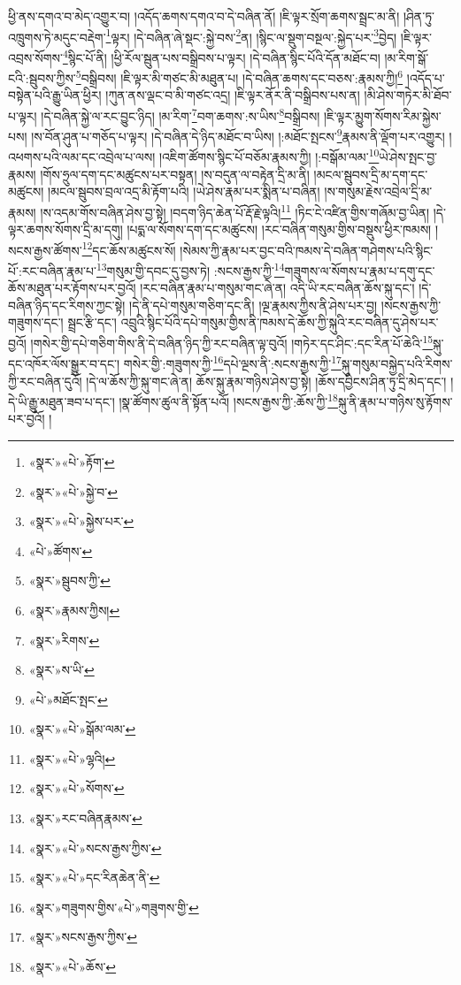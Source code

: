 ཕྱི་ནས་དགའ་བ་མེད་འགྱུར་བ། །འདོད་ཆགས་དགའ་བ་དེ་བཞིན་ནོ། །ཇི་ལྟར་སྲོག་ཆགས་སྦྲང་མ་ནི། །ཤིན་ཏུ་འཁྲུགས་ཏེ་མདུང་བརྡེག་\footnote{«སྣར་»«པེ་»རྟོག་}ལྟར། །དེ་བཞིན་ཞེ་སྡང་:སྐྱེ་བས་\footnote{«སྣར་»«པེ་»སྐྱེ་བ་}ན། །སྙིང་ལ་སྡུག་བསྔལ་:སྐྱེད་པར་\footnote{«སྣར་»«པེ་»སྐྱེས་པར་}བྱེད། །ཇི་ལྟར་འབྲས་སོགས་\footnote{«པེ་»ཚོགས་}སྙིང་པོ་ནི། །ཕྱི་རོལ་སྦུན་པས་བསྒྲིབས་པ་ལྟར། །དེ་བཞིན་སྙིང་པོའི་དོན་མཐོང་བ། །མ་རིག་སྒོ་ངའི་:སྦུབས་ཀྱིས་\footnote{«སྣར་»སྦུབས་ཀྱི་}བསྒྲིབས། །ཇི་ལྟར་མི་གཙང་མི་མཐུན་པ། །དེ་བཞིན་ཆགས་དང་བཅས་:རྣམས་ཀྱི།\footnote{«སྣར་»རྣམས་ཀྱིས།} །འདོད་པ་བསྟེན་པའི་རྒྱུ་ཡིན་ཕྱིར། །ཀུན་ནས་ལྡང་བ་མི་གཙང་འདྲ། །ཇི་ལྟར་ནོར་ནི་བསྒྲིབས་པས་ན། །མི་ཤེས་གཏེར་མི་ཐོབ་པ་ལྟར། །དེ་བཞིན་སྐྱེ་ལ་རང་བྱུང་ཉིད། །མ་རིག་\footnote{«སྣར་»རིགས་}བག་ཆགས་:ས་ཡིས་\footnote{«སྣར་»ས་ཡི་}བསྒྲིབས། །ཇི་ལྟར་མྱུག་སོགས་རིམ་སྐྱེས་པས། །ས་བོན་ཤུན་པ་གཅོད་པ་ལྟར། །དེ་བཞིན་དེ་ཉིད་མཐོང་བ་ཡིས། །:མཐོང་སྤངས་\footnote{«པེ་»མཐོང་སྤང་}རྣམས་ནི་ལྡོག་པར་འགྱུར། །འཕགས་པའི་ལམ་དང་འབྲེལ་པ་ལས། །འཇིག་ཚོགས་སྙིང་པོ་བཅོམ་རྣམས་ཀྱི། །:བསྒོམ་ལམ་\footnote{«སྣར་»«པེ་»སྒོམ་ལམ་}ཡེ་ཤེས་སྤང་བྱ་རྣམས། །གོས་ཧྲུལ་དག་དང་མཚུངས་པར་བསྟན། །ས་བདུན་ལ་བརྟེན་དྲི་མ་ནི། །མངལ་སྦུབས་དྲི་མ་དག་དང་མཚུངས། །མངལ་སྦུབས་བྲལ་འདྲ་མི་རྟོག་པའི། །ཡེ་ཤེས་རྣམ་པར་སྨིན་པ་བཞིན། །ས་གསུམ་རྗེས་འབྲེལ་དྲི་མ་རྣམས། །ས་འདམ་གོས་བཞིན་ཤེས་བྱ་སྟེ། །བདག་ཉིད་ཆེན་པོ་རྡོ་རྗེ་ལྟའི།\footnote{«སྣར་»«པེ་»ལྷའི།} །ཏིང་ངེ་འཛིན་གྱིས་གཞོམ་བྱ་ཡིན། །དེ་ལྟར་ཆགས་སོགས་དྲི་མ་དགུ། །པདྨ་ལ་སོགས་དག་དང་མཚུངས། །རང་བཞིན་གསུམ་གྱིས་བསྡུས་ཕྱིར་ཁམས། །སངས་རྒྱས་ཚོགས་\footnote{«སྣར་»«པེ་»སོགས་}དང་ཆོས་མཚུངས་སོ། །སེམས་ཀྱི་རྣམ་པར་བྱང་བའི་ཁམས་དེ་བཞིན་གཤེགས་པའི་སྙིང་པོ་:རང་བཞིན་རྣམ་པ་\footnote{«སྣར་»རང་བཞིནརྣམས་}གསུམ་གྱི་དབང་དུ་བྱས་ཏེ། :སངས་རྒྱས་ཀྱི་\footnote{«སྣར་»«པེ་»སངས་རྒྱས་ཀྱིས་}གཟུགས་ལ་སོགས་པ་རྣམ་པ་དགུ་དང་ཆོས་མཐུན་པར་རྟོགས་པར་བྱའོ། །རང་བཞིན་རྣམ་པ་གསུམ་གང་ཞེ་ན། འདི་ཡི་རང་བཞིན་ཆོས་སྐུ་དང་། །དེ་བཞིན་ཉིད་དང་རིགས་ཀྱང་སྟེ། །དེ་ནི་དཔེ་གསུམ་གཅིག་དང་ནི། །ལྔ་རྣམས་ཀྱིས་ནི་ཤེས་པར་བྱ། །སངས་རྒྱས་ཀྱི་གཟུགས་དང་། སྦྲང་རྩི་དང་། འབྲུའི་སྙིང་པོའི་དཔེ་གསུམ་གྱིས་ནི་ཁམས་དེ་ཆོས་ཀྱི་སྐུའི་རང་བཞིན་དུ་ཤེས་པར་བྱའོ། །གསེར་གྱི་དཔེ་གཅིག་གིས་ནི་དེ་བཞིན་ཉིད་ཀྱི་རང་བཞིན་ལྟ་བུའོ། །གཏེར་དང་ཤིང་:དང་རིན་པོ་ཆེའི་\footnote{«སྣར་»«པེ་»དང་རིནཆེན་ནི་}སྐུ་དང་འཁོར་ལོས་སྒྱུར་བ་དང་། གསེར་གྱི་:གཟུགས་ཀྱི་\footnote{«སྣར་»གཟུགས་གྱིས་«པེ་»གཟུགས་གྱི་}དཔེ་ལྔས་ནི་:སངས་རྒྱས་ཀྱི་\footnote{«སྣར་»སངས་རྒྱས་ཀྱིས་}སྐུ་གསུམ་བསྐྱེད་པའི་རིགས་ཀྱི་རང་བཞིན་དུའོ། །དེ་ལ་ཆོས་ཀྱི་སྐུ་གང་ཞེ་ན། ཆོས་སྐུ་རྣམ་གཉིས་ཤེས་བྱ་སྟེ། །ཆོས་དབྱིངས་ཤིན་ཏུ་དྲི་མེད་དང་། །དེ་ཡི་རྒྱུ་མཐུན་ཟབ་པ་དང་། །སྣ་ཚོགས་ཚུལ་ནི་སྟོན་པའོ། །སངས་རྒྱས་ཀྱི་:ཆོས་ཀྱི་\footnote{«སྣར་»«པེ་»ཆོས་}སྐུ་ནི་རྣམ་པ་གཉིས་སུ་རྟོགས་པར་བྱའོ། །
